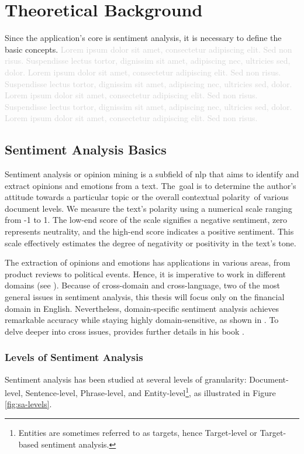 \chapter{Theoretical Background}
\label{chap:theoretical-background}
Since the application's core is sentiment analysis, it is necessary to define the basic concepts. \textcolor{lightgray}{Lorem ipsum dolor sit amet, consectetur adipiscing elit. Sed non risus. Suspendisse lectus tortor, dignissim sit amet, adipiscing nec, ultricies sed, dolor. Lorem ipsum dolor sit amet, consectetur adipiscing elit. Sed non risus. Suspendisse lectus tortor, dignissim sit amet, adipiscing nec, ultricies sed, dolor. Lorem ipsum dolor sit amet, consectetur adipiscing elit. Sed non risus. Suspendisse lectus tortor, dignissim sit amet, adipiscing nec, ultricies sed, dolor. Lorem ipsum dolor sit amet, consectetur adipiscing elit. Sed non risus.}

\section{Sentiment Analysis Basics}
\label{sec:sentiment-analysis-basics}
Sentiment analysis or opinion mining is a subfield of \acrfull{nlp} that aims to identify and extract opinions and emotions from a text. The~goal is to determine the author's attitude towards a particular topic or the overall contextual polarity~of various document levels. We measure the text's polarity using a numerical scale ranging from -1 to 1. The low-end score of the scale signifies a negative sentiment, zero represents neutrality, and the high-end score indicates a positive sentiment. This scale effectively estimates the degree of negativity or positivity in the text's tone. 

The extraction of opinions and emotions has applications in various areas, from product reviews to political events. Hence, it is imperative to work in different domains (see \cite{PIRYANI2017122}). Because of cross-domain and cross-language, two of the most general issues in sentiment analysis, this thesis will focus only on the financial domain in English. Nevertheless, domain-specific sentiment analysis achieves remarkable accuracy while staying highly domain-sensitive, as shown in \parencite{saunders_2020}. To delve deeper into cross issues, \citeauthor{liu2022sentiment} provides further details in his book \parencite{liu2022sentiment}.

\subsection{Levels of Sentiment Analysis}
\label{subsec:levels-of-sentiment-analysis}
Sentiment analysis has been studied at several levels of granularity: Document-level, Sentence-level, Phrase-level, and Entity-level\footnote{Entities are sometimes referred to as targets, hence Target-level or Target-based sentiment analysis.}, as illustrated in Figure \ref{fig:sa-levels}.

